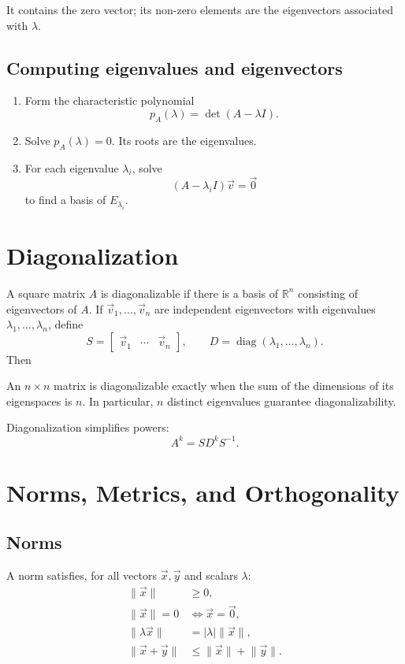 \documentclass{article}
\begin{document}
It contains the zero vector; its non-zero elements are the
eigenvectors associated with $\lambda$.

\subsection{Computing eigenvalues and eigenvectors}
\begin{enumerate}
    \item Form the characteristic polynomial
          \[
              p_A(\lambda)=\det(A-\lambda I).
          \]
    \item Solve $p_A(\lambda)=0$. Its roots are the eigenvalues.
    \item For each eigenvalue $\lambda_i$, solve
          \[
              (A-\lambda_i I)\vec{v}=\vec{0}
          \]
          to find a basis of $E_{\lambda_i}$.
\end{enumerate}

\section{Diagonalization}

A square matrix $A$ is diagonalizable if there is a basis of
$\mathbb{R}^n$ consisting of eigenvectors of $A$. If
$\vec{v}_1,\dots,\vec{v}_n$ are independent eigenvectors with
eigenvalues $\lambda_1,\dots,\lambda_n$, define
\[
    S=\begin{bmatrix}\vec{v}_1&\cdots&\vec{v}_n\end{bmatrix},
    \qquad
    D=\operatorname{diag}(\lambda_1,\dots,\lambda_n).
\]
Then

An $n\times n$ matrix is diagonalizable exactly when the sum of the
dimensions of its eigenspaces is $n$. In particular, $n$ distinct
eigenvalues guarantee diagonalizability.

Diagonalization simplifies powers:
\[
    A^k=SD^kS^{-1}.
\]

\section{Norms, Metrics, and Orthogonality}

\subsection{Norms}
A norm satisfies, for all vectors $\vec{x},\vec{y}$ and scalars
$\lambda$:
\begin{align*}
    \lVert\vec{x}\rVert&\geq0,\\
    \lVert\vec{x}\rVert=0&\Longleftrightarrow\vec{x}=\vec{0},\\
    \lVert\lambda\vec{x}\rVert&=|\lambda|\lVert\vec{x}\rVert,\\
    \lVert\vec{x}+\vec{y}\rVert
        &\leq\lVert\vec{x}\rVert+\lVert\vec{y}\rVert.
\end{align*}
\end{document}
